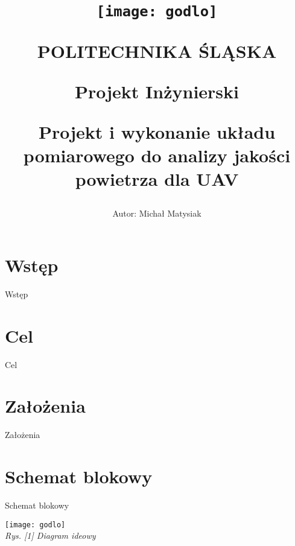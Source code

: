\documentclass[a4paper, 12pt]{article}
\title {
	\begin{center}
	\texttt{[image: godlo]}
	
	\vspace{1cm}
	
	\large {
		\textbf {
			POLITECHNIKA ŚLĄSKA
		}

		\vspace{1cm}

		Projekt Inżynierski
	}

	\vspace{1cm}
	
	\LARGE {\textbf {Projekt i wykonanie układu pomiarowego do analizy jakości powietrza dla UAV}}
	
	\vspace{5cm}

	\end{center}
}
\author{
	Autor: Michał Matysiak\\
	
	\vspace{1cm}
	
}
\date {
	\begin{center}
	\textit{Gliwice, Styczeń 2021}
	\end{center}
}
\begin{document}

\maketitle
\newpage

\tableofcontents
{}
\newpage

\section{Wstęp}
\hspace{0.6cm}Wstęp
\newpage
\section{Cel}
\hspace{0.6cm}Cel

\section{Założenia}
\hspace{0.6cm}Założenia

\newpage




\section{Schemat blokowy}
\hspace{0.6cm}Schemat blokowy
\begin{center}
\texttt{[image: godlo]}\\
\textit{Rys. [1] Diagram ideowy}
\end{center}
\end{document}
